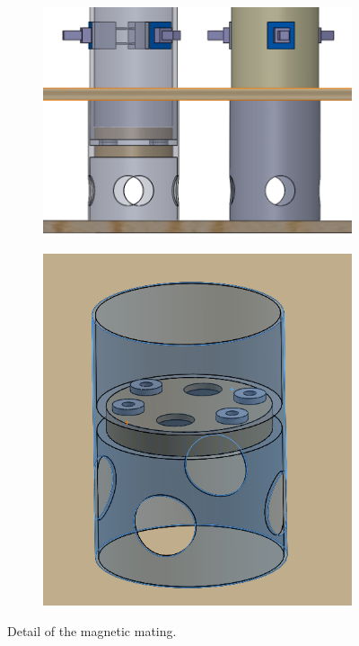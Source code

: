 \documentclass[a4paper,twoside]{book}
\begin{document}
\begin{figure}[h]
 
\begin{subfigure}{0.5\textwidth}
\includegraphics[width=0.9\linewidth]{img/DettaglioConnesioneTotemBoard}
\end{subfigure}
\begin{subfigure}{0.5\textwidth}
\includegraphics[width=0.9\linewidth]{img/DettaglioConnesioneTotemBoard1}
\end{subfigure}
 
\caption{Detail of the magnetic mating.}
\end{figure}
\end{document}
